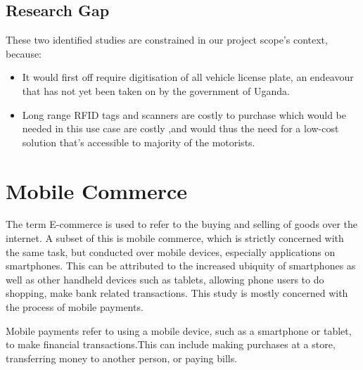 \subsection{Research Gap}
These two identified studies are constrained in our project scope’s context, because:
\begin{itemize}
    \item It would first off require digitisation of all vehicle license plate, an endeavour that has not yet been taken on by the government of Uganda.
    \item Long range RFID tags and scanners are costly to purchase which would be needed in this use case are costly ,and would thus the need for a low-cost solution that’s accessible to majority of the motorists.
\end{itemize}

\clearpage


\section{Mobile Commerce}
The term E-commerce is used to refer to the buying and selling of goods over the internet. A subset of this is mobile commerce, which is strictly concerned with the same task, but conducted over mobile devices, \cite{varshney_mobile_2000} especially applications on smartphones. This can be attributed to the increased ubiquity of smartphones as well as other handheld devices such as tablets, allowing phone users to do shopping, make bank related transactions. This study is mostly concerned with the process of mobile payments.

Mobile payments refer to using a mobile device, such as a smartphone or tablet, to make financial transactions.This can include making purchases at a store, transferring money to another person, or paying bills.

